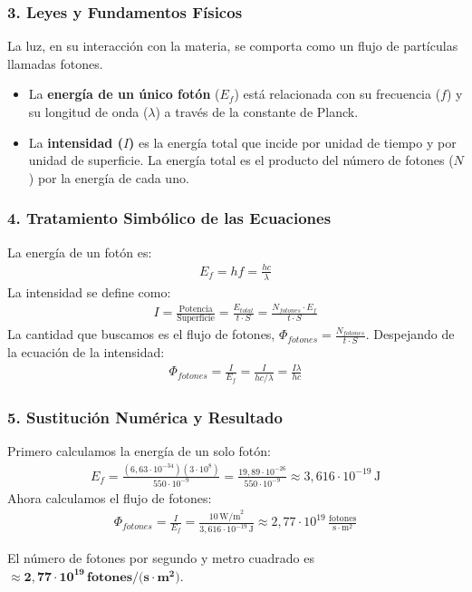 \subsubsection*{3. Leyes y Fundamentos Físicos}
La luz, en su interacción con la materia, se comporta como un flujo de partículas llamadas fotones.
\begin{itemize}
    \item La \textbf{energía de un único fotón} ($E_{f}$) está relacionada con su frecuencia ($f$) y su longitud de onda ($\lambda$) a través de la constante de Planck.
    \item La \textbf{intensidad ($I$)} es la energía total que incide por unidad de tiempo y por unidad de superficie. La energía total es el producto del número de fotones ($N$) por la energía de cada uno.
\end{itemize}

\subsubsection*{4. Tratamiento Simbólico de las Ecuaciones}
La energía de un fotón es:
\begin{gather}
    E_f = hf = \frac{hc}{\lambda}
\end{gather}
La intensidad se define como:
\begin{gather}
    I = \frac{\text{Potencia}}{\text{Superficie}} = \frac{E_{total}}{t \cdot S} = \frac{N_{fotones} \cdot E_f}{t \cdot S}
\end{gather}
La cantidad que buscamos es el flujo de fotones, $\Phi_{fotones} = \frac{N_{fotones}}{t \cdot S}$. Despejando de la ecuación de la intensidad:
\begin{gather}
    \Phi_{fotones} = \frac{I}{E_f} = \frac{I}{hc/\lambda} = \frac{I \lambda}{hc}
\end{gather}

\subsubsection*{5. Sustitución Numérica y Resultado}
Primero calculamos la energía de un solo fotón:
\begin{gather}
    E_f = \frac{(6,63\cdot10^{-34})(3\cdot10^8)}{550\cdot10^{-9}} = \frac{19,89\cdot10^{-26}}{550\cdot10^{-9}} \approx 3,616\cdot10^{-19}\,\text{J}
\end{gather}
Ahora calculamos el flujo de fotones:
\begin{gather}
    \Phi_{fotones} = \frac{I}{E_f} = \frac{10\,\text{W/m}^2}{3,616\cdot10^{-19}\,\text{J}} \approx 2,77 \cdot 10^{19}\,\frac{\text{fotones}}{\text{s}\cdot\text{m}^2}
\end{gather}
\begin{cajaresultado}
El número de fotones por segundo y metro cuadrado es $\boldsymbol{\approx 2,77 \cdot 10^{19}\,\textbf{fotones/(s}\cdot\textbf{m}^2\textbf{)}}$.
\end{cajaresultado}

